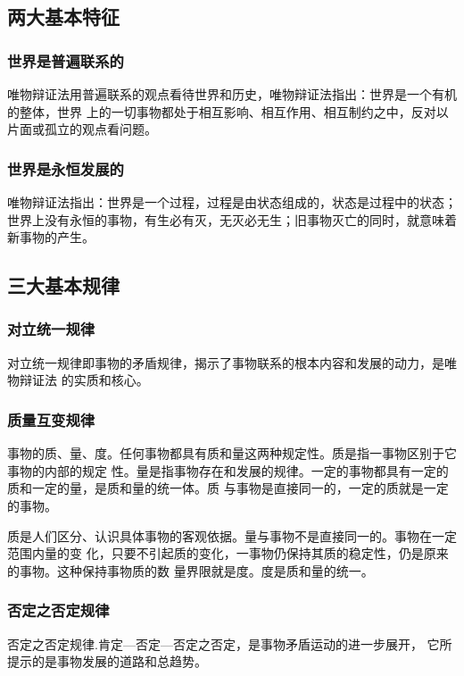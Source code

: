\documentclass{article}
\begin{document}
    \subsection{两大基本特征}
    \subsubsection{世界是普遍联系的}
    唯物辩证法用普遍联系的观点看待世界和历史，唯物辩证法指出：世界是一个有机的整体，世界
    上的一切事物都处于相互影响、相互作用、相互制约之中，反对以片面或孤立的观点看问题。
    \subsubsection{世界是永恒发展的}
    唯物辩证法指出：世界是一个过程，过程是由状态组成的，状态是过程中的状态；
    世界上没有永恒的事物，有生必有灭，无灭必无生；旧事物灭亡的同时，就意味着新事物的产生。
    \subsection{三大基本规律}
        \subsubsection{对立统一规律}

    对立统一规律即事物的矛盾规律，揭示了事物联系的根本内容和发展的动力，是唯物辩证法
    的实质和核心。
        \subsubsection{质量互变规律}

    事物的质、量、度。任何事物都具有质和量这两种规定性。质是指一事物区别于它事物的内部的规定
    性。量是指事物存在和发展的规律。一定的事物都具有一定的质和一定的量，是质和量的统一体。质
    与事物是直接同一的，一定的质就是一定的事物。

    质是人们区分、认识具体事物的客观依据。量与事物不是直接同一的。事物在一定范围内量的变
    化，只要不引起质的变化，一事物仍保持其质的稳定性，仍是原来的事物。这种保持事物质的数
    量界限就是度。度是质和量的统一。

    \subsubsection{否定之否定规律}
    
    否定之否定规律.肯定—否定—否定之否定，是事物矛盾运动的进一步展开，
    它所提示的是事物发展的道路和总趋势。
\end{document}
